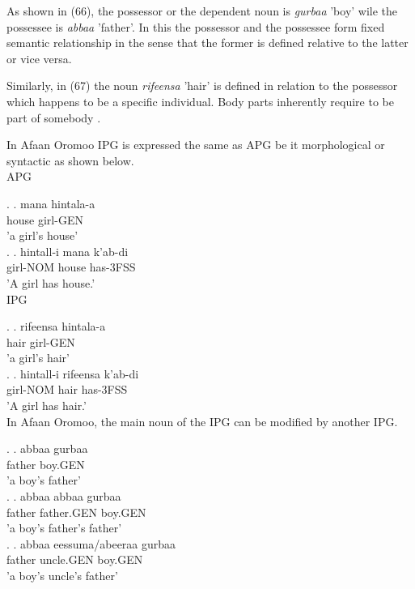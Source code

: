 \documentclass[11pt,a4paper]{article}
\begin{document}
	As shown in (66), the possessor or the dependent noun is \emph{gurbaa} 'boy' wile the possessee is \emph{abbaa} 'father'. In this the possessor and the possessee form fixed semantic relationship in the sense that the former is defined relative to the latter or vice versa. 
	
	Similarly, in (67) the noun \emph{rifeensa} 'hair' is defined in relation to the possessor which happens to be a specific individual. Body parts inherently require to be part of somebody \cite[161]{gebregziabher2012alienable}.
	
	In Afaan Oromoo IPG is expressed the same as APG be it morphological or syntactic as shown below. \\
	
	APG
	
	\ex.
	\ag.
	mana hintala-a\\
	house girl-GEN\\
	'a girl's house'\\
	
	\ex.
	\ag.
	hintall-i mana k'ab-di\\
	girl-NOM house has-3FSS\\
	'A girl has house.'\\
	
	IPG
	
	\ex.
	\ag.
	rifeensa hintala-a\\
	hair girl-GEN\\
	'a girl's hair'\\
	
	\ex.
	\ag.
	hintall-i rifeensa k'ab-di\\
	girl-NOM hair has-3FSS\\
	'A girl has hair.'\\
	
	In Afaan Oromoo, the main noun of the IPG can be modified by another IPG.
	
	\ex.
	\ag.
	abbaa gurbaa\\
	father boy.GEN\\
	'a boy's father'\\
	
	\ex.
	\ag.
	abbaa abbaa gurbaa\\
	father father.GEN boy.GEN\\
	'a boy's father's father'\\
	
	\ex.
	\ag.
	abbaa eessuma/abeeraa gurbaa\\
	father uncle.GEN boy.GEN\\
	'a boy's uncle's father'\\
	
\end{document}
